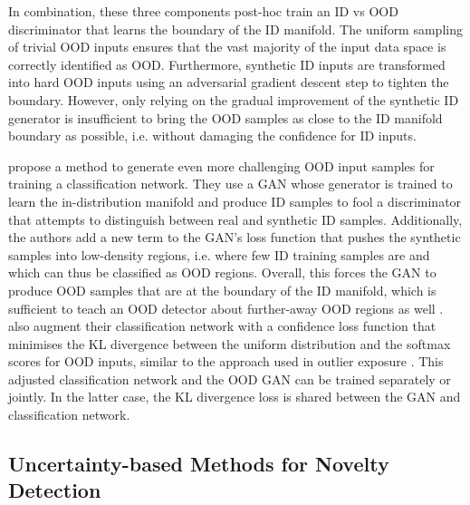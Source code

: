 \noindent In combination, these three components post-hoc train an ID vs OOD discriminator that learns the boundary of the ID manifold. The uniform sampling of trivial OOD inputs ensures that the vast majority of the input data space is correctly identified as OOD. Furthermore, synthetic ID inputs are transformed into hard OOD inputs using an adversarial gradient descent step to tighten the boundary. However, only relying on the gradual improvement of the synthetic ID generator is insufficient to bring the OOD samples as close to the ID manifold boundary as possible, i.e. without damaging the confidence for ID inputs.

\newpar \textcite{ood-training-2017} propose a method to generate even more challenging OOD input samples for training a classification network. They use a GAN whose generator is trained to learn the in-distribution manifold and produce ID samples to fool a discriminator that attempts to distinguish between real and synthetic ID samples. Additionally, the authors add a new term to the GAN's loss function that pushes the synthetic samples into low-density regions, i.e. where few ID training samples are and which can thus be classified as OOD regions. Overall, this forces the GAN to produce OOD samples that are at the boundary of the ID manifold, which is sufficient to teach an OOD detector about further-away OOD regions as well \cite{noise-contrastive-uq-2020}. \citeauthor{ood-training-2017} also augment their classification network with a confidence loss function that minimises the KL divergence between the uniform distribution and the softmax scores for OOD inputs, similar to the approach used in outlier exposure \cite{ood-exposure-2018}. This adjusted classification network and the OOD GAN can be trained separately or jointly. In the latter case, the KL divergence loss is shared between the GAN and classification network.

\subsection{Uncertainty-based Methods for Novelty Detection} \label{txt:uq-conf-method}

